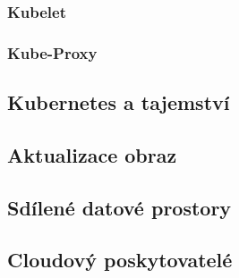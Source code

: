 \subsubsection{Kubelet}



\subsubsection{Kube-Proxy}



\subsection{Kubernetes a tajemství}



\subsection{Aktualizace obraz}



\subsection{Sdílené datové prostory}



\subsection{Cloudový poskytovatelé}



